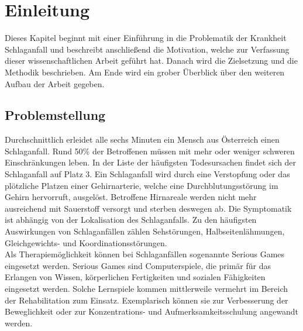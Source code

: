 \chapter{Einleitung}\label{sec:introduction}
Dieses Kapitel beginnt mit einer Einführung in die Problematik der Krankheit Schlaganfall und beschreibt anschließend die Motivation, welche zur Verfassung dieser wissenschaftlichen Arbeit geführt hat. Danach wird die Zielsetzung und die Methodik beschrieben. Am Ende wird ein grober Überblick über den weiteren Aufbau der Arbeit gegeben.

\section{Problemstellung}
Durchschnittlich erleidet alle sechs Minuten ein Mensch aus Österreich einen Schlaganfall. Rund 50\% der Betroffenen müssen mit mehr oder weniger schweren Einschränkungen leben. In der Liste der häufigsten Todesursachen findet sich der Schlaganfall auf Platz 3. 
Ein Schlaganfall wird durch eine Verstopfung oder das plötzliche Platzen einer Gehirnarterie, welche eine Durchblutungsstörung im Gehirn hervorruft, ausgelöst. Betroffene Hirnareale werden nicht mehr ausreichend mit Sauerstoff versorgt und sterben deswegen ab. Die Symptomatik ist abhängig von der Lokalisation des Schlaganfalls. Zu den häufigsten Auswirkungen von Schlaganfällen zählen Sehstörungen, Halbseitenlähmungen, Gleichgewichts- und Koordinationsstörungen. \cite{haring:2014:insult} \\
Als Therapiemöglichkeit können bei Schlaganfällen sogenannte Serious Games eingesetzt werden. Serious Games sind Computerspiele, die primär für das Erlangen von Wissen, körperlichen Fertigkeiten und sozialen Fähigkeiten eingesetzt werden. Solche Lernspiele kommen mittlerweile vermehrt im Bereich der Rehabilitation zum Einsatz. Exemplarisch können sie zur Verbesserung der Beweglichkeit oder zur Konzentrations- und Aufmerksamkeitsschulung angewandt werden. \cite{krueger-heike:2013:serious-game} \\

